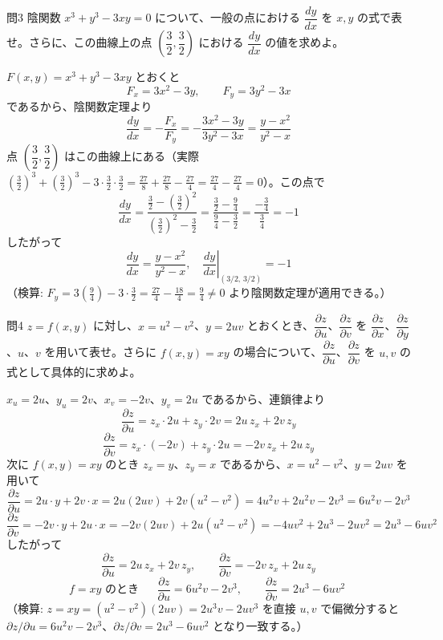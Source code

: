\documentclass[a4paper,11pt]{article}
\begin{document}
\clearpage
\begin{mondaiboxS}{問3}
陰関数 $x^{3} + y^{3} - 3xy = 0$ について、一般の点における $\dfrac{dy}{dx}$ を $x,y$ の式で表せ。さらに、この曲線上の点 $\left(\dfrac{3}{2}, \dfrac{3}{2}\right)$ における $\dfrac{dy}{dx}$ の値を求めよ。
\end{mondaiboxS}
\kaitou
$F(x,y) = x^{3} + y^{3} - 3xy$ とおくと
\[
F_{x} = 3x^{2} - 3y, \qquad F_{y} = 3y^{2} - 3x
\]
であるから、陰関数定理より
\[
\frac{dy}{dx} = -\frac{F_{x}}{F_{y}} = -\frac{3x^{2}-3y}{3y^{2}-3x} = \frac{y-x^{2}}{y^{2}-x}
\]
点 $\left(\dfrac{3}{2},\dfrac{3}{2}\right)$ はこの曲線上にある（実際 $\left(\tfrac{3}{2}\right)^{3}+\left(\tfrac{3}{2}\right)^{3}-3\cdot\tfrac{3}{2}\cdot\tfrac{3}{2} = \tfrac{27}{8}+\tfrac{27}{8}-\tfrac{27}{4} = \tfrac{27}{4}-\tfrac{27}{4}=0$）。この点で
\[
\frac{dy}{dx} = \frac{\frac{3}{2} - \left(\frac{3}{2}\right)^{2}}{\left(\frac{3}{2}\right)^{2} - \frac{3}{2}} = \frac{\frac{3}{2}-\frac{9}{4}}{\frac{9}{4}-\frac{3}{2}} = \frac{-\frac{3}{4}}{\frac{3}{4}} = -1
\]
したがって
\[
\boxed{\; \frac{dy}{dx} = \frac{y-x^{2}}{y^{2}-x}, \quad \left.\frac{dy}{dx}\right|_{(3/2,\,3/2)} = -1 \;}
\]
（検算: $F_y = 3\left(\tfrac{9}{4}\right)-3\cdot\tfrac{3}{2} = \tfrac{27}{4}-\tfrac{18}{4}=\tfrac{9}{4}\ne 0$ より陰関数定理が適用できる。）

\clearpage
\begin{mondaiboxS}{問4}
$z = f(x,y)$ に対し、$x = u^{2} - v^{2}$、$y = 2uv$ とおくとき、$\dfrac{\partial z}{\partial u}$、$\dfrac{\partial z}{\partial v}$ を $\dfrac{\partial z}{\partial x}$、$\dfrac{\partial z}{\partial y}$、$u$、$v$ を用いて表せ。さらに $f(x,y) = xy$ の場合について、$\dfrac{\partial z}{\partial u}$、$\dfrac{\partial z}{\partial v}$ を $u,v$ の式として具体的に求めよ。
\end{mondaiboxS}
\kaitou
$x_{u} = 2u$、$y_{u} = 2v$、$x_{v} = -2v$、$y_{v} = 2u$ であるから、連鎖律より
\[
\frac{\partial z}{\partial u} = z_{x}\cdot 2u + z_{y}\cdot 2v = 2u\,z_{x} + 2v\,z_{y}
\]
\[
\frac{\partial z}{\partial v} = z_{x}\cdot(-2v) + z_{y}\cdot 2u = -2v\,z_{x} + 2u\,z_{y}
\]
次に $f(x,y) = xy$ のとき $z_{x} = y$、$z_{y} = x$ であるから、$x = u^{2}-v^{2}$、$y=2uv$ を用いて
\[
\frac{\partial z}{\partial u} = 2u\cdot y + 2v\cdot x = 2u(2uv) + 2v(u^{2}-v^{2}) = 4u^{2}v + 2u^{2}v - 2v^{3} = 6u^{2}v - 2v^{3}
\]
\[
\frac{\partial z}{\partial v} = -2v\cdot y + 2u\cdot x = -2v(2uv) + 2u(u^{2}-v^{2}) = -4uv^{2} + 2u^{3} - 2uv^{2} = 2u^{3} - 6uv^{2}
\]
したがって
\[
\boxed{\; \frac{\partial z}{\partial u} = 2u\,z_{x}+2v\,z_{y},\qquad \frac{\partial z}{\partial v} = -2v\,z_{x}+2u\,z_{y} \;}
\]
\[
f=xy \text{ のとき }\quad
\boxed{\; \frac{\partial z}{\partial u} = 6u^{2}v-2v^{3},\qquad \frac{\partial z}{\partial v} = 2u^{3}-6uv^{2} \;}
\]
（検算: $z = xy = (u^{2}-v^{2})(2uv) = 2u^{3}v - 2uv^{3}$ を直接 $u,v$ で偏微分すると $\partial z/\partial u = 6u^{2}v-2v^{3}$、$\partial z/\partial v = 2u^{3}-6uv^{2}$ となり一致する。）
\end{document}
